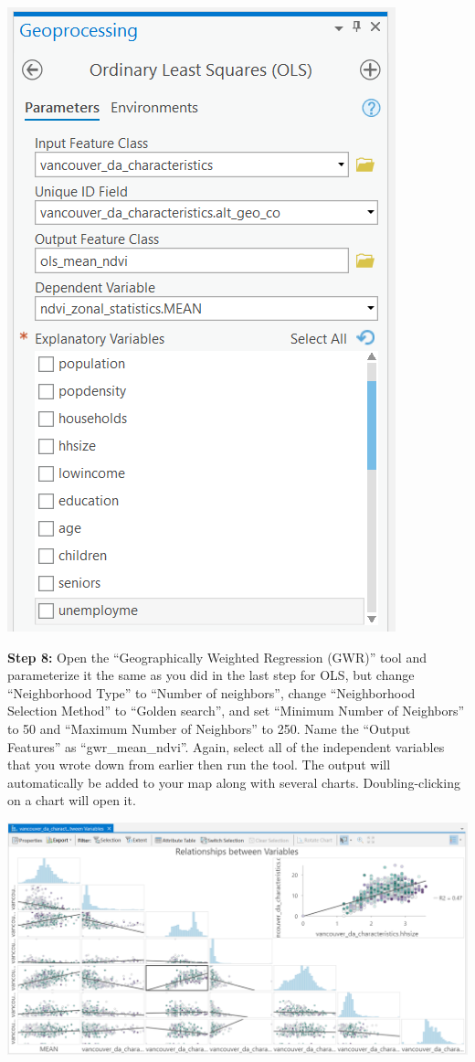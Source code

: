 \documentclass[
]{book}
\begin{document}
\includegraphics[width=0.75\linewidth]{images/05-arcgis-ols}

\textbf{Step 8:} Open the ``Geographically Weighted Regression (GWR)'' tool and parameterize it the same as you did in the last step for OLS, but change ``Neighborhood Type'' to ``Number of neighbors'', change ``Neighborhood Selection Method'' to ``Golden search'', and set ``Minimum Number of Neighbors'' to 50 and ``Maximum Number of Neighbors'' to 250. Name the ``Output Features'' as ``gwr\_mean\_ndvi''. Again, select all of the independent variables that you wrote down from earlier then run the tool. The output will automatically be added to your map along with several charts. Doubling-clicking on a chart will open it.

\includegraphics[width=0.75\linewidth]{images/05-arcgis-variable-chart}
\end{document}
